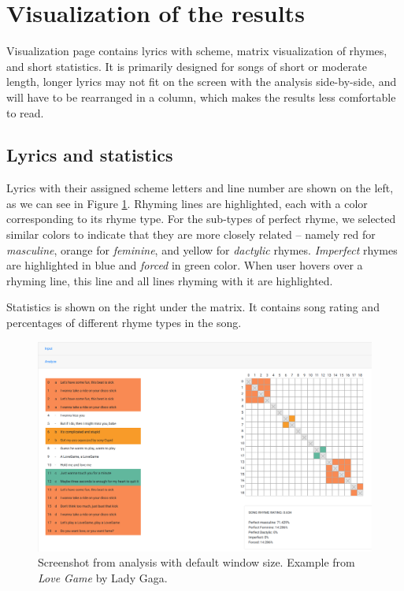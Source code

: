 \section{Visualization of the results}
Visualization page contains lyrics with scheme, matrix visualization of rhymes, and short statistics. It is primarily designed for songs of short or moderate length, longer lyrics may not fit on the screen with the analysis side-by-side, and will have to be rearranged in a column, which makes the results less comfortable to read.

\subsection{Lyrics and statistics}\label{sec-lyrics_and_stats}
Lyrics with their assigned scheme letters and line number are shown on the left, as we can see in Figure \ref{web-analysis_window5}. Rhyming lines are highlighted, each with a color corresponding to its rhyme type. For the sub-types of perfect rhyme, we selected similar colors to indicate that they are more closely related -- namely red for \textit{masculine}, orange for \textit{feminine}, and yellow for \textit{dactylic} rhymes. \textit{Imperfect} rhymes are highlighted in blue and \textit{forced} in green color. When user hovers over a rhyming line, this line and all lines rhyming with it are highlighted.

Statistics is shown on the right under the matrix. It contains song rating and percentages of different rhyme types in the song.

\begin{figure}[h]\centering
	\includegraphics[scale=0.25]{../img/love_game_lady_gaga.png}
	\caption[Screenshot from analysis with default window size.]{Screenshot from analysis with default window size. Example from \textit{Love Game} by Lady Gaga.}
	\label{web-analysis_window5}
\end{figure}

